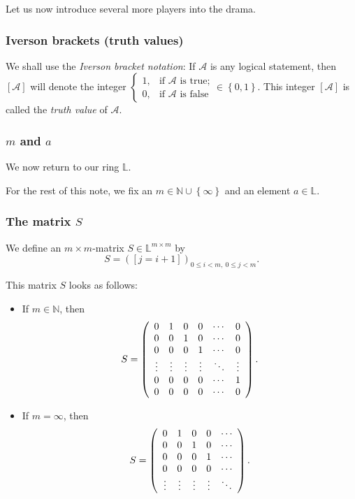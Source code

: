 \documentclass[numbers=enddot,12pt,final,onecolumn,notitlepage]{scrartcl}%
\theoremstyle{definition}
\begin{document}
Let us now introduce several more players into the drama.

\subsubsection{Iverson brackets (truth values)}

We shall use the \textit{Iverson bracket notation}: If $\mathcal{A}$ is any
logical statement, then $\left[  \mathcal{A}\right]  $ will denote the integer
$%
\begin{cases}
1, & \text{if }\mathcal{A}\text{ is true;}\\
0, & \text{if }\mathcal{A}\text{ is false}%
\end{cases}
\in\left\{  0,1\right\}  $. This integer $\left[  \mathcal{A}\right]  $ is
called the \textit{truth value} of $\mathcal{A}$.

\subsubsection{$m$ and $a$}

We now return to our ring $\mathbb{L}$.

For the rest of this note, we fix an $m\in\mathbb{N}\cup\left\{
\infty\right\}  $ and an element $a\in\mathbb{L}$.

\subsubsection{The matrix $S$}

We define an $m\times m$-matrix $S\in\mathbb{L}^{m\times m}$ by%
\begin{equation}
S=\left(  \left[  j=i+1\right]  \right)  _{0\leq i<m,\ 0\leq j<m}.
\label{eq.S=}%
\end{equation}


This matrix $S$ looks as follows:

\begin{itemize}
\item If $m\in\mathbb{N}$, then%
\[
S=\left(
\begin{array}
[c]{cccccc}%
0 & 1 & 0 & 0 & \cdots & 0\\
0 & 0 & 1 & 0 & \cdots & 0\\
0 & 0 & 0 & 1 & \cdots & 0\\
\vdots & \vdots & \vdots & \vdots & \ddots & \vdots\\
0 & 0 & 0 & 0 & \cdots & 1\\
0 & 0 & 0 & 0 & \cdots & 0
\end{array}
\right)  .
\]


\item If $m=\infty$, then%
\[
S=\left(
\begin{array}
[c]{ccccc}%
0 & 1 & 0 & 0 & \cdots\\
0 & 0 & 1 & 0 & \cdots\\
0 & 0 & 0 & 1 & \cdots\\
0 & 0 & 0 & 0 & \cdots\\
\vdots & \vdots & \vdots & \vdots & \ddots
\end{array}
\right)  .
\]

\end{itemize}
\end{document}
